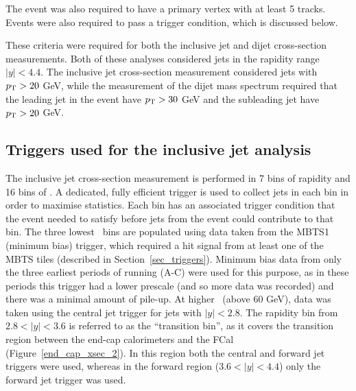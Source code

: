 
 The event was also required to have a primary vertex with at least 5 tracks. Events were also required to pass a trigger condition, which is discussed below.

These criteria were required for both the inclusive jet  and dijet cross-section measurements. Both of these analyses considered jets in the rapidity range $|y| < 4.4$. The inclusive jet cross-section measurement considered jets with $p_{\mathrm{T}} > 20$ GeV, while the measurement of the dijet mass spectrum required that the leading jet in the event have $p_{\mathrm{T}} > 30$ GeV and the subleading jet have $p_{\mathrm{T}} > 20$ GeV.


\subsection{Triggers used for the inclusive jet analysis}
\label{incjet_triggers}

The inclusive jet cross-section measurement is performed in 7 bins of rapidity and 16 bins of \pt. A dedicated, fully efficient trigger is used to collect jets in each bin in order to maximise statistics. Each bin has an associated  trigger condition that the event needed to satisfy before jets from the event could contribute to that bin. The three lowest \pt~bins are populated using data taken from the MBTS1 (minimum bias) trigger, which required a hit signal from at least one of the MBTS tiles (described in Section~\ref{sec_triggers}). Minimum bias data from only the three earliest periods of running (A-C) were used for this purpose, as in these periods this trigger had a lower prescale (and so more data was recorded) and there was a minimal amount of pile-up. At higher \pt~(above 60 GeV), data was taken using the central jet trigger for jets with $|y| < 2.8$. The rapidity bin from $2.8 < |y| < 3.6$ is referred to as the ``transition bin'', as it covers the transition region between the end-cap calorimeters and the FCal (Figure~\ref{end_cap_xsec_2}). In this region both the central and forward jet triggers were used, whereas in the forward region ($3.6 < |y| < 4.4$) only the forward jet trigger was used. 


